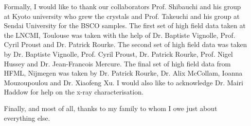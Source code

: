 Formally, I would like to thank our collaborators Prof. Shibauchi and his group at Kyoto university who grew the \BaFeAsP{} crystals and Prof. Takeuchi and his group at Sendai University for the \acs{BSCO} samples. The first set of high field data taken at the \ac{LNCMI}, Toulouse was taken with the help of Dr. Baptiste Vignolle, Prof. Cyril Proust and Dr. Patrick Rourke. The second set of high field data was taken by Dr. Baptiste Vignolle, Prof. Cyril Proust, Dr. Patrick Rourke, Prof. Nigel Hussey and Dr. Jean-Francois Mercure. The final set of high field data from \ac{HFML}, Nijmegen was taken by Dr. Patrick Rourke, Dr. Alix McCollam, Ioanna Mouzoupoulou and Dr. Xiaofeng Xu. I would also like to acknowledge Dr. Mairi Haddow for help on the x-ray characterisation.

Finally, and most of all, thanks to my family to whom I owe just about everything else.





